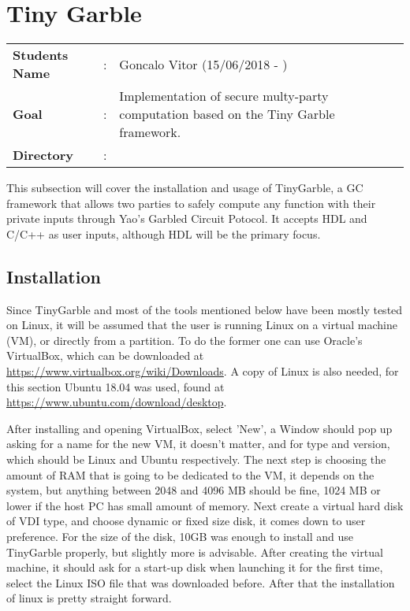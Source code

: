 \clearpage
\section{Tiny Garble}

\begin{refsection}

\begin{tcolorbox}	
\begin{tabular}{p{2.75cm} p{0.2cm} p{10.5cm}} 	
\textbf{Students Name}      &:& Goncalo Vitor (15/06/2018 - )\\
\textbf{Goal}               &:& Implementation of secure multy-party computation based on the Tiny Garble framework.\\
\textbf{Directory}          &:& \\
\end{tabular}
\end{tcolorbox}



This subsection will cover the installation and usage of TinyGarble, a GC framework that allows two parties to safely compute any function with their private inputs through Yao's Garbled Circuit Potocol. It accepts HDL and C/C++ as user inputs, although HDL will be the primary focus.

\subsection{Installation}

Since TinyGarble and most of the tools mentioned below have been mostly tested on Linux, it will be assumed that the user is running Linux on a virtual machine (VM), or directly from a partition. To do the former one can use Oracle's VirtualBox, which can be downloaded at \url{https://www.virtualbox.org/wiki/Downloads}. A copy of Linux is also needed, for this section Ubuntu 18.04 was used, found at \url{https://www.ubuntu.com/download/desktop}.

After installing and opening VirtualBox, select 'New', a Window should pop up asking for a name for the new VM, it doesn't matter, and for type and version, which should be Linux and Ubuntu respectively. The next step is choosing the amount of RAM that is going to be dedicated to the VM,  it depends on the system, but anything between 2048 and 4096 MB should be fine, 1024 MB or lower if the host PC has small amount of memory. Next create a virtual hard disk of VDI type, and choose dynamic or fixed size disk, it comes down to user preference. For the size of the disk, 10GB was enough to install and use TinyGarble properly, but slightly more is advisable.
After creating the virtual machine, it should ask for a start-up disk when launching it for the first time, select the Linux ISO file that was downloaded before. After that the installation of linux is pretty straight forward.


\end{refsection}
